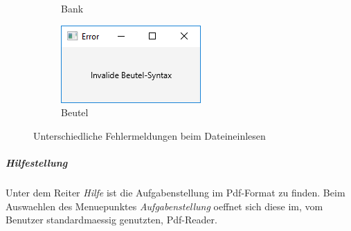 \begin{figure}
\begin{subfigure}[b]{0.35\textwidth}
            \caption[]%
            {{\small Bank}}    
            \label{fig:mean and std of net34}
        \end{subfigure}
        \quad
        \begin{subfigure}[b]{0.35\textwidth}   
            \centering 
            \includegraphics[width=\textwidth]{screenshots/screenshot_ErrorBeutel}
            \caption[]%
            {{\small Beutel}}    
            \label{fig:mean and std of net44}
        \end{subfigure}
        \caption
        {\small Unterschiedliche Fehlermeldungen beim Dateineinlesen} 
        \label{fig:mean and std of nets}
    \end{figure}

\subparagraph{Hilfestellung}
Unter dem Reiter \emph{Hilfe} ist die Aufgabenstellung im Pdf-Format zu finden. Beim Auswaehlen des Menuepunktes \emph{Aufgabenstellung} oeffnet sich diese im, vom Benutzer standardmaessig genutzten, Pdf-Reader. 

\clearpage
